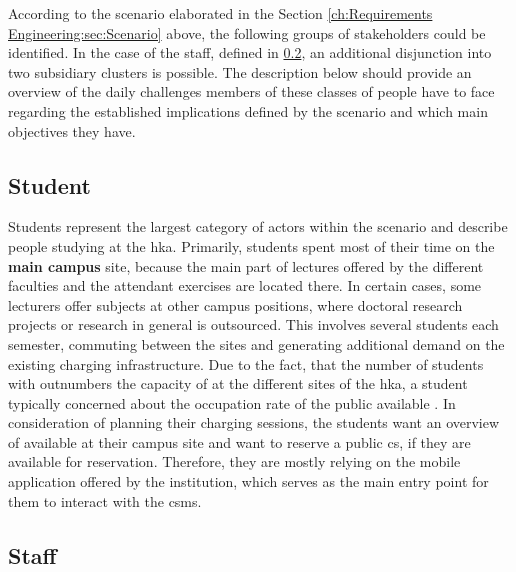 According to the scenario elaborated in the Section \ref{ch:Requirements Engineering:sec:Scenario} above, the following groups of stakeholders could be identified. 
In the case of the staff, defined in \ref{ch:Requirements Engineering:sec:Stakeholders:ssec:Staff}, an additional disjunction into two subsidiary clusters is possible. 
The description below should provide an overview of the daily challenges members of these classes of people have to face regarding the established implications defined by the scenario and which main objectives they have. 

\subsection{Student}
\label{ch:Requirements Engineering:sec:Stakeholders:ssec:Student}

Students represent the largest category of actors within the scenario and describe people studying at the \acrshort{hka}. Primarily, students spent most of their time on the \textbf{main campus} site, because the main part of lectures offered by the different faculties and the attendant exercises are located there.
In certain cases, some lecturers offer subjects at other campus positions, where doctoral research projects or research in general is outsourced. This involves several students each semester, commuting between the sites and generating additional demand on the existing charging infrastructure.
Due to the fact, that the number of students with  outnumbers the capacity of  at the different sites of the \acrshort{hka}, a student typically concerned about the occupation rate of the public available .
In consideration of planning their charging sessions, the students want an overview of available  at their campus site and want to reserve a public \acrshort{cs}, if they are available for reservation.
Therefore, they are mostly relying on the mobile application offered by the institution, which serves as the main entry point for them to interact with the \acrshort{csms}. 

\subsection{Staff}
\label{ch:Requirements Engineering:sec:Stakeholders:ssec:Staff}


